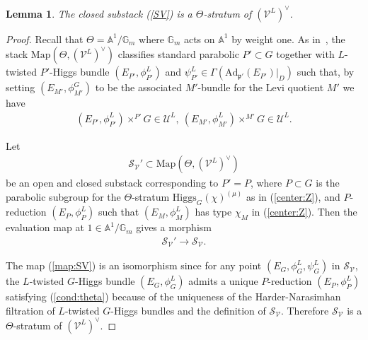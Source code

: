 \documentclass [11pt,oneside,a4paper,mathscr]{amsart}
\newtheorem{lemma}[thm]{Lemma}
\theoremstyle{definition}
\newcommand{\sS}{\mathcal{S}}
\newcommand{\V}{\mathcal{V}}
\newcommand{\Ad}{\mathrm{Ad}}
\newcommand{\Hig}{\mathrm{Higgs}}
\begin{document}
\begin{lemma}\label{lem:theta:crit}
The closed substack (\ref{SV}) is a $\Theta$-stratum of $(\V^L)^{\vee}$. 
\end{lemma}
\begin{proof}
Recall that $\Theta=\mathbb{A}^1/\mathbb{G}_m$ where $\mathbb{G}_m$ acts on 
$\mathbb{A}^1$ by weight one. 
As in~\cite[Lemma~6.3.1]{halpinstab}, the 
stack $\mathrm{Map}(\Theta, (\V^L)^{\vee})$ classifies
standard parabolic $P'\subset G$ together with $L$-twisted $P'$-Higgs bundle 
$(E_{P'}, \phi_{P'}^L)$ and $\psi_{P'}^L \in \Gamma(\Ad_{\mathfrak{p}'}(E_{P'})|_{D})$
such that, by setting $(E_{M'}, \phi_{M'}^G)$ to be the associated $M'$-bundle for the 
Levi quotient $M'$ we have 
\begin{align}\label{cond:theta}
    (E_{P'}, \phi_{P'}^L) \times^{P'} G \in \mathcal{U}^L, \ (E_{M'}, \phi_{M'}^L)\times^{M'} G \in \mathcal{U}^L.
\end{align}

Let 
\begin{align*}\mathcal{S}_{\V}' \subset \mathrm{Map}(\Theta, (\V^L)^{\vee})
\end{align*}
be an open and closed substack corresponding to $P'=P$, where $P\subset G$ is the parabolic subgroup for the $\Theta$-stratum 
$\Hig_G(\chi)^{(\mu)}$ as in (\ref{center:Z}), and 
$P$-reduction $(E_P, \phi_P^L)$ such that 
$(E_M, \phi_M^L)$ has type $\chi_M$ in (\ref{center:Z}). 
Then the evaluation map at $1 \in \mathbb{A}^1/\mathbb{G}_m$ gives a 
morphism 
\begin{align}\label{map:SV}\sS_{\V}' \to \sS_{\V}.
\end{align}

The map (\ref{map:SV}) 
is an isomorphism since for any point 
$(E_G, \phi_G^{L}, \psi_G^{L})$
in $\sS_{\V}$, the $L$-twisted $G$-Higgs bundle $(E_G, \phi_G^{L})$ admits a unique $P$-reduction
$(E_P, \phi_P^L)$ 
satisfying (\ref{cond:theta})
because of the uniqueness of 
the Harder-Narasimhan filtration of $L$-twisted $G$-Higgs bundles and the definition of $\sS_{\V}$.
Therefore $\sS_{\V}$ is a $\Theta$-stratum of $(\V^L)^{\vee}$. 
\end{proof}
\end{document}

